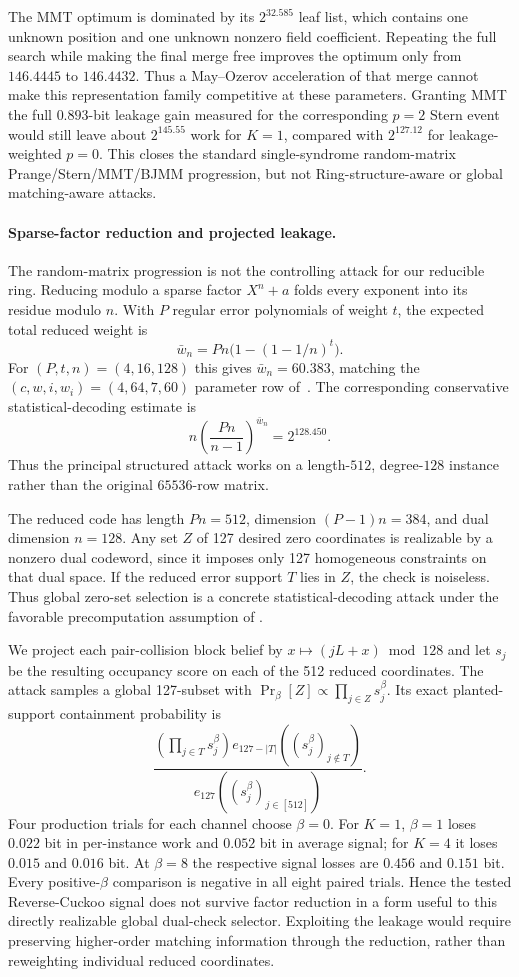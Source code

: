 The MMT optimum is dominated by its $2^{32.585}$ leaf list, which contains one
unknown position and one unknown nonzero field coefficient.  Repeating the
full search while making the final merge free improves the optimum only from
$146.4445$ to $146.4432$.  Thus a May--Ozerov acceleration of that merge cannot
make this representation family competitive at these parameters.  Granting
MMT the full $0.893$-bit leakage gain measured for the corresponding $p=2$
Stern event would still leave about $2^{145.55}$ work for $K=1$, compared with
$2^{127.12}$ for leakage-weighted $p=0$.  This closes the standard
single-syndrome random-matrix Prange/Stern/MMT/BJMM progression, but not
Ring-structure-aware or global matching-aware attacks.

\paragraph{Sparse-factor reduction and projected leakage.}
The random-matrix progression is not the controlling attack for our reducible
ring.  Reducing modulo a sparse factor $X^n+a$ folds every exponent into its
residue modulo $n$.  With $P$ regular error polynomials of weight $t$, the
expected total reduced weight is
\[
 \bar w_n=Pn\bigl(1-(1-1/n)^t\bigr).
\]
For $(P,t,n)=(4,16,128)$ this gives $\bar w_n=60.383$, matching the
$(c,w,i,w_i)=(4,64,7,60)$ parameter row of~\cite{boyle2020efficient}.  The
corresponding conservative statistical-decoding estimate is
\[
 n\left(\frac{Pn}{n-1}\right)^{\bar w_n}=2^{128.450}.
\]
Thus the principal structured attack works on a length-$512$, degree-$128$
instance rather than the original $65536$-row matrix.

The reduced code has length $Pn=512$, dimension $(P-1)n=384$, and dual
dimension $n=128$.  Any set $Z$ of 127 desired zero coordinates is realizable
by a nonzero dual codeword, since it imposes only 127 homogeneous constraints
on that dual space.  If the reduced error support $T$ lies in $Z$, the check is
noiseless.  Thus global zero-set selection is a concrete statistical-decoding
attack under the favorable precomputation assumption of
\cite{boyle2020efficient}.

We project each pair-collision block belief by
$x\mapsto(jL+x)\bmod128$ and let $s_j$ be the resulting occupancy score on
each of the 512 reduced coordinates.  The attack samples a global 127-subset
with $\Pr_\beta[Z]\propto\prod_{j\in Z}s_j^\beta$.  Its exact planted-support
containment probability is
\[
 \frac{\left(\prod_{j\in T}s_j^\beta\right)
 e_{127-|T|}((s_j^\beta)_{j\notin T})}
 {e_{127}((s_j^\beta)_{j\in[512]})}.
\]
Four production trials for each channel choose $\beta=0$.  For $K=1$,
$\beta=1$ loses $0.022$ bit in per-instance work and $0.052$ bit in average
signal; for $K=4$ it loses $0.015$ and $0.016$ bit.  At $\beta=8$ the
respective signal losses are $0.456$ and $0.151$ bit.  Every positive-$\beta$
comparison is negative in all eight paired trials.  Hence the tested
Reverse-Cuckoo signal does not survive factor reduction in a form useful to
this directly realizable global dual-check selector.  Exploiting the leakage
would require preserving higher-order matching information through the
reduction, rather than reweighting individual reduced coordinates.


